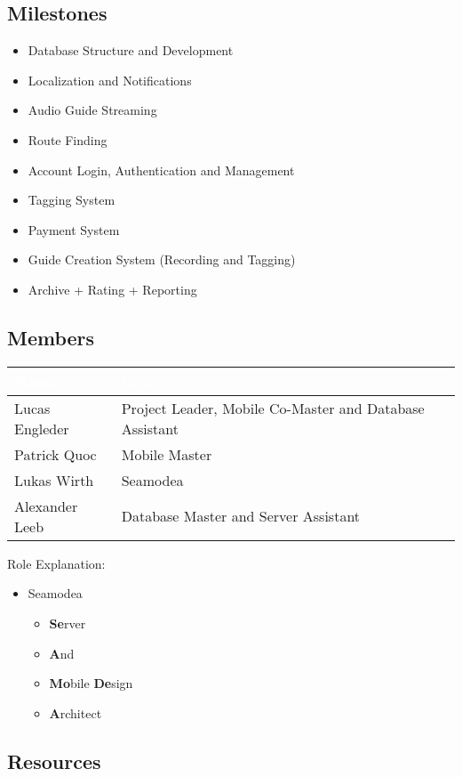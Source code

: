 \documentclass[12pt]{article}
\theoremstyle{definition}
\begin{document}
\subsection{Milestones}
\begin{itemize}
\item Database Structure and Development
\item Localization and Notifications
\item Audio Guide Streaming
\item Route Finding
\item Account Login, Authentication and Management
\item Tagging System
\item Payment System
\item Guide Creation System (Recording and Tagging)
\item Archive + Rating + Reporting
\end{itemize}

\subsection{Members}
\begin{tabular}{|l|l|}
\hline
\cellcolor[gray]{0.5}\textcolor{white}{Name} & \cellcolor[gray]{0.5}\textcolor{white}{Role}\\ \hline
Lucas Engleder & Project Leader, Mobile Co-Master and Database Assistant\\ \hline
Patrick Quoc & Mobile Master\\ \hline
Lukas Wirth & Seamodea \\  \hline
Alexander Leeb & Database Master and Server Assistant \\ \hline
\end{tabular}

Role Explanation:
\begin{itemize}
    \item Seamodea
    \begin{itemize}
        \item \textbf{Se}rver
        \item \textbf{A}nd
        \item \textbf{Mo}bile \textbf{De}sign
        \item \textbf{A}rchitect
    \end{itemize} 
\end{itemize}
\subsection{Resources}
\end{document}
